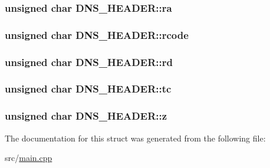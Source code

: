 \hypertarget{struct_d_n_s___h_e_a_d_e_r_ab689629314dd78eb571b9d4d82feef8a}{
\subsubsection[{ra}]{\setlength{\rightskip}{0pt plus 5cm}unsigned char D\-N\-S\-\_\-\-H\-E\-A\-D\-E\-R\-::ra}}\label{struct_d_n_s___h_e_a_d_e_r_ab689629314dd78eb571b9d4d82feef8a}
\hypertarget{struct_d_n_s___h_e_a_d_e_r_a3b7ff1e78cc57527d2afe217fd4d0178}{
\subsubsection[{rcode}]{\setlength{\rightskip}{0pt plus 5cm}unsigned char D\-N\-S\-\_\-\-H\-E\-A\-D\-E\-R\-::rcode}}\label{struct_d_n_s___h_e_a_d_e_r_a3b7ff1e78cc57527d2afe217fd4d0178}
\hypertarget{struct_d_n_s___h_e_a_d_e_r_ae36057dbcab8fd192148aed912270462}{
\subsubsection[{rd}]{\setlength{\rightskip}{0pt plus 5cm}unsigned char D\-N\-S\-\_\-\-H\-E\-A\-D\-E\-R\-::rd}}\label{struct_d_n_s___h_e_a_d_e_r_ae36057dbcab8fd192148aed912270462}
\hypertarget{struct_d_n_s___h_e_a_d_e_r_acfd94249b1b03793d63a6b87fea41d9e}{
\subsubsection[{tc}]{\setlength{\rightskip}{0pt plus 5cm}unsigned char D\-N\-S\-\_\-\-H\-E\-A\-D\-E\-R\-::tc}}\label{struct_d_n_s___h_e_a_d_e_r_acfd94249b1b03793d63a6b87fea41d9e}
\hypertarget{struct_d_n_s___h_e_a_d_e_r_a4a09d9fe1ea80fcc992af0e4a90b0e6c}{
\subsubsection[{z}]{\setlength{\rightskip}{0pt plus 5cm}unsigned char D\-N\-S\-\_\-\-H\-E\-A\-D\-E\-R\-::z}}\label{struct_d_n_s___h_e_a_d_e_r_a4a09d9fe1ea80fcc992af0e4a90b0e6c}


The documentation for this struct was generated from the following file\-:\begin{DoxyCompactItemize}
\item 
src/\hyperlink{main_8cpp}{main.\-cpp}\end{DoxyCompactItemize}

